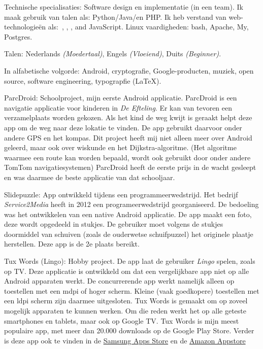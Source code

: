 \documentclass[10pt,a4paper]{article}
\begin{document}
\inlineheadsection  %
  {Technische specialisaties:}
  {Software design en implementatie (in een team). 
  Ik maak gebruik van talen als: Python/\nsp Java/\nsp en PHP. 
  Ik heb verstand van web-technologie\"en als:\ , , ,  and JavaScript. Linux vaardigheden: bash, Apache, My, Postgres.}

\inlineheadsection
  {Talen:}
  {Nederlands \emph{(Moedertaal)}, Engels \emph{(Vloeiend)}, Duits \emph{(Beginner)}.}


\spacedhrule{1.6em}{-0.4em}


\inlineheadsection
  {In alfabetische volgorde:}
  {Android, cryptografie, Google-producten, muziek, open source,  software engineering, typograpfie (\LaTeX).}

\spacedhrule{1.6em}{-0.4em}


\inlineheadsection
  {ParcDroid:}
  {Schoolproject, mijn eerste Android applicatie. ParcDroid is een navigatie applicatie voor kinderen in \emph{De Efteling}. Er kan van tevoren een verzamelplaats worden gekozen. Als het kind de weg kwijt is geraakt helpt deze app om de weg naar deze lokatie te vinden. De app gebruikt daarvoor onder andere GPS en het kompas. Dit project heeft mij niet alleen meer over Android geleerd, maar ook over wiskunde en het Dijkstra-algoritme. (Het algoritme waarmee een route kan worden bepaald, wordt ook gebruikt door onder andere TomTom navigatiesystemen) ParcDroid heeft de eerste prijs in de wacht gesleept en was daarmee de beste applicatie van dat schooljaar.}
  
\inlineheadsection
{Slidepuzzle:}
{App ontwikkeld tijdens een programmeerwedstrijd. Het bedrijf \emph{Service2Media} heeft in 2012 een programeerwedstrijd georganiseerd. De bedoeling was het ontwikkelen van een native Android applicatie. De app maakt een foto, deze wordt opgedeeld in stukjes. De gebruiker moet volgens de stukjes doormiddel van schuiven (zoals de ouderwetse schuifpuzzel) het originele plaatje herstellen. Deze app is de 2e plaats bereikt.}

\inlineheadsection
{Tux Words (Lingo):}
{Hobby project. De app laat de gebruiker \emph{Lingo} spelen, zoals op TV. Deze applicatie is ontwikkeld om dat een vergelijkbare app niet op alle Android apparaten werkt. De concurrerende app werkt namelijk alleen op toestellen met een mdpi of hoger scherm. Kleine (vaak goedkopere) toestellen met een ldpi scherm zijn daarmee uitgesloten. Tux Words is gemaakt om op zoveel mogelijk apparaten te kunnen werken. Om die reden werkt het op alle geteste smartphones en tablets, maar ook op Google TV. Tux Words is mijn meest populaire app, met meer dan 20.000 downloads op de Google Play Store. Verder is deze app ook te vinden in de \href{http://apps.samsung.com/venus/topApps/topAppsDetail.as?productId=000000498917}{Samsung Apps Store} en de \href{http://www.amazon.com/FrankkieNL-Tux-Words-Lingo/dp/B0096M4AYU/}{Amazon Appstore}}
\end{document}
